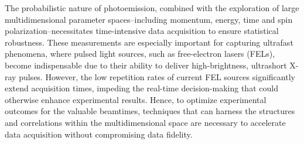 



The probabilistic nature of photoemission, combined with the exploration of large multidimensional parameter spaces--including momentum, energy, time and spin polarization--necessitates time-intensive data acquisition to ensure statistical robustness. These measurements are especially important for capturing ultrafast phenomena, where pulsed light sources, such as free-electron lasers (FELs), become indispensable due to their ability to deliver high-brightness, ultrashort X-ray pulses. However, the low repetition rates of current FEL sources significantly extend acquisition times, impeding the real-time decision-making that could otherwise enhance experimental results. Hence, to optimize experimental outcomes for the valuable beamtimes, techniques that can harness the structures and correlations within the multidimensional space are necessary to accelerate data acquisition without compromising data fidelity.

